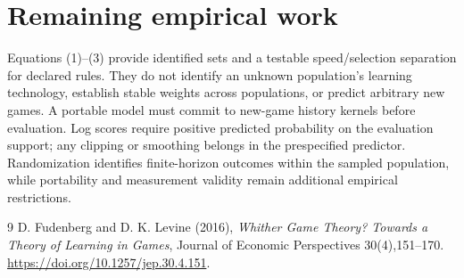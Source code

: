 \documentclass[11pt]{article}
\theoremstyle{definition}
\begin{document}
\section*{Remaining empirical work}
Equations (1)--(3) provide identified sets and a testable speed/selection
separation for declared rules. They do not identify an unknown population's
learning technology, establish stable weights across populations, or predict
arbitrary new games. A portable model must commit to new-game history
kernels before evaluation. Log scores require positive predicted probability
on the evaluation support; any clipping or smoothing belongs in the
prespecified predictor. Randomization identifies finite-horizon outcomes
within the sampled population, while portability and measurement validity
remain additional empirical restrictions.
\begin{thebibliography}{9}
 D. Fudenberg and D. K. Levine (2016), \emph{Whither Game
Theory? Towards a Theory of Learning in Games}, Journal of Economic
Perspectives 30(4),151--170.
\url{https://doi.org/10.1257/jep.30.4.151}.
\end{thebibliography}
\end{document}
